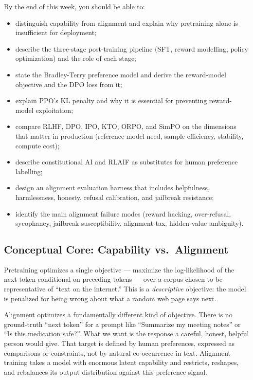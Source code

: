 By the end of this week, you should be able to:
\begin{itemize}
  \item distinguish capability from alignment and explain why
        pretraining alone is insufficient for deployment;
  \item describe the three-stage post-training pipeline (SFT,
        reward modelling, policy optimization) and the role of each
        stage;
  \item state the Bradley-Terry preference model and derive the
        reward-model objective and the DPO loss from it;
  \item explain PPO's KL penalty and why it is essential for
        preventing reward-model exploitation;
  \item compare RLHF, DPO, IPO, KTO, ORPO, and SimPO on the
        dimensions that matter in production (reference-model need,
        sample efficiency, stability, compute cost);
  \item describe constitutional AI and RLAIF as substitutes for
        human preference labelling;
  \item design an alignment evaluation harness that includes
        helpfulness, harmlessness, honesty, refusal calibration,
        and jailbreak resistance;
  \item identify the main alignment failure modes (reward hacking,
        over-refusal, sycophancy, jailbreak susceptibility,
        alignment tax, hidden-value ambiguity).
\end{itemize}

\subsection{Conceptual Core: Capability vs.\ Alignment}

Pretraining optimizes a single objective --- maximize the
log-likelihood of the next token conditional on preceding tokens
--- over a corpus chosen to be representative of ``text on the
internet.'' This is a \emph{descriptive} objective: the model is
penalized for being wrong about what a random web page says next.

Alignment optimizes a fundamentally different kind of objective.
There is no ground-truth ``next token'' for a prompt like ``Summarize
my meeting notes'' or ``Is this medication safe?''. What we want is
the response a careful, honest, helpful person would give. That
target is defined by human preferences, expressed as comparisons or
constraints, not by natural co-occurrence in text. Alignment
training takes a model with enormous latent capability and
restricts, reshapes, and rebalances its output distribution against
this preference signal.

